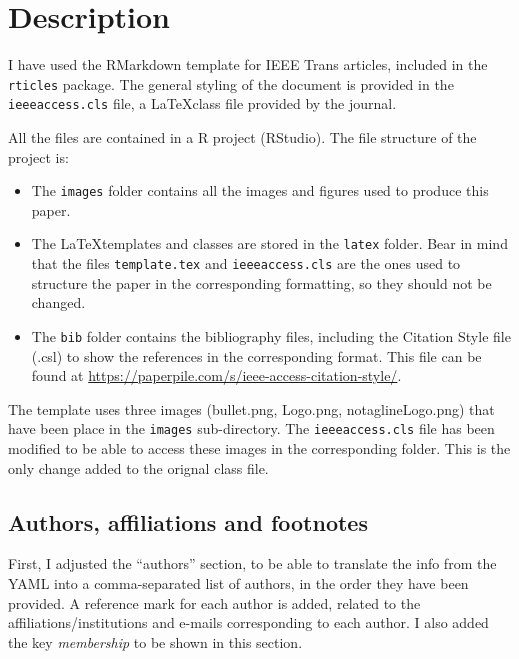 \documentclass[]{latex/ieeeaccess}
\providecommand{\tightlist}{%
  \setlength{\itemsep}{0pt}\setlength{\parskip}{0pt}}
\begin{document}
\hypertarget{description}{%
\section{Description}\label{description}}

I have used the RMarkdown template for IEEE Trans articles, included in
the \texttt{rticles} package. The general styling of the document is
provided in the \texttt{ieeeaccess.cls} file, a \LaTeX class file
provided by the journal.

All the files are contained in a R project (RStudio). The file structure
of the project is:

\begin{itemize}
\tightlist
\item
  The \texttt{images} folder contains all the images and figures used to
  produce this paper.
\item
  The \LaTeX templates and classes are stored in the \texttt{latex}
  folder. Bear in mind that the files \texttt{template.tex} and
  \texttt{ieeeaccess.cls} are the ones used to structure the paper in
  the corresponding formatting, so they should not be changed.
\item
  The \texttt{bib} folder contains the bibliography files, including the
  Citation Style file (.csl) to show the references in the corresponding
  format. This file can be found at
  \url{https://paperpile.com/s/ieee-access-citation-style/}.
\end{itemize}

The template uses three images (bullet.png, Logo.png, notaglineLogo.png)
that have been place in the \texttt{images} sub-directory. The
\texttt{ieeeaccess.cls} file has been modified to be able to access
these images in the corresponding folder. This is the only change added
to the orignal class file.

\hypertarget{authors-affiliations-and-footnotes}{%
\subsection{Authors, affiliations and
footnotes}\label{authors-affiliations-and-footnotes}}

First, I adjusted the ``authors'' section, to be able to translate the
info from the YAML into a comma-separated list of authors, in the order
they have been provided. A reference mark for each author is added,
related to the affiliations/institutions and e-mails corresponding to
each author. I also added the key \emph{membership} to be shown in this
section.
\end{document}
